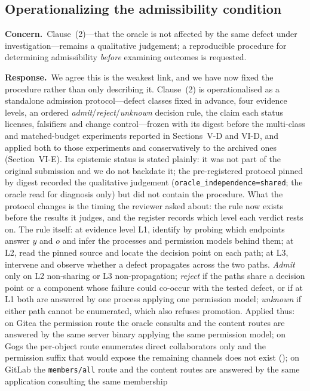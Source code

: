 \documentclass[10pt,letterpaper]{article}
\newcommand{\Concern}[1]{\par\smallskip\noindent\textbf{Concern.}\ #1\par}
\newcommand{\Response}[1]{\par\smallskip\noindent\textbf{Response.}\ #1\par}
\begin{document}
\subsection{Operationalizing the admissibility condition}
\Concern{Clause~(2)---that the oracle is not affected by the same defect under
investigation---remains a qualitative judgement; a reproducible procedure for
determining admissibility \emph{before} examining outcomes is requested.}
\Response{We agree this is the weakest link, and we have now fixed the procedure
rather than only describing it. Clause~(2) is operationalised as a standalone
admission protocol---defect classes fixed in advance, four evidence levels,
an ordered \emph{admit}/\emph{reject}/\emph{unknown} decision rule, the claim each
status licenses, falsifiers and change control---frozen with its digest before
the multi-class and matched-budget experiments reported in Sections~V-D and VI-D,
and applied both to those experiments and conservatively to the archived ones
(Section~VI-E). Its epistemic status is stated plainly: it was not part of the
original submission and we do not backdate it; the pre-registered protocol pinned
by digest recorded the qualitative judgement
(\texttt{oracle\_independence=shared}; the oracle read for diagnosis only) but
did not contain the procedure. What the protocol changes is the timing the
reviewer asked about: the rule now exists before the results it judges, and the
register records which level each verdict rests on. The rule itself: at evidence
level L1, identify by probing which endpoints answer $y$ and $o$ and infer the
processes and permission models behind them; at L2, read the pinned source and
locate the decision point on each path; at L3, intervene and observe whether a
defect propagates across the two paths. \emph{Admit} only on L2 non-sharing or
L3 non-propagation; \emph{reject} if the paths share a decision point or a
component whose failure could co-occur with the tested defect, or if at L1 both
are answered by one process applying one permission model; \emph{unknown} if
either path cannot be enumerated, which also refuses promotion. Applied thus: on
Gitea the permission route the oracle consults and the content routes are
answered by the same server binary applying the same permission model; on Gogs
the per-object route enumerates direct collaborators only and the permission
suffix that would expose the remaining channels does not exist
(\GgChProbePermSuffix); on GitLab the \texttt{members/all} route and the content
routes are answered by the same application consulting the same membership
}
\end{document}
